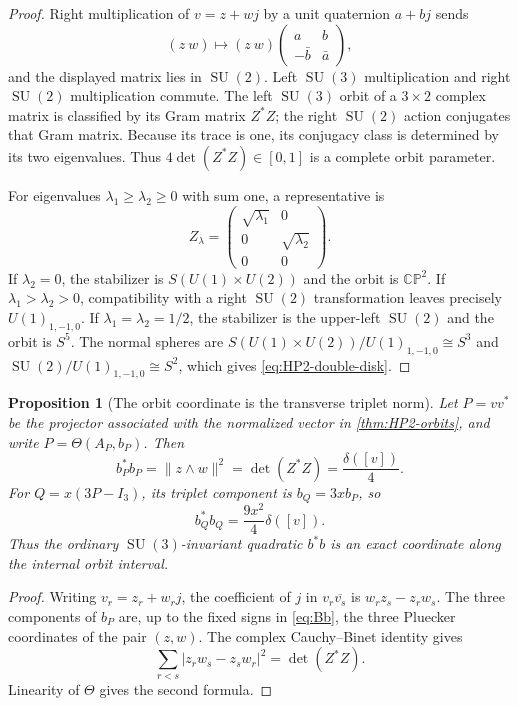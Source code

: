 \documentclass[11pt]{article}
\newtheorem{proposition}[theorem]{Proposition}
\theoremstyle{definition}
\theoremstyle{remark}
\newcommand{\CP}{\mathbb{CP}}
\newcommand{\SU}{\operatorname{SU}}
\begin{document}
\begin{proof}
Right multiplication of $v=z+w j$ by a unit quaternion $a+bj$ sends
\[
 (z\ w)\longmapsto
 (z\ w)
 \begin{pmatrix}a&b\\-\bar b&\bar a\end{pmatrix},
\]
and the displayed matrix lies in $\SU(2)$.  Left $\SU(3)$ multiplication and
right $\SU(2)$ multiplication commute.  The left $\SU(3)$ orbit of a
$3\times2$ complex matrix is classified by its Gram matrix $Z^*Z$; the right
$\SU(2)$ action conjugates that Gram matrix.  Because its trace is one, its
conjugacy class is determined by its two eigenvalues.  Thus
$4\det(Z^*Z)\in[0,1]$ is a complete orbit parameter.

For eigenvalues $\lambda_1\geq\lambda_2\geq0$ with sum one, a representative
is
\[
 Z_{\lambda}
 =\begin{pmatrix}\sqrt{\lambda_1}&0\\
                  0&\sqrt{\lambda_2}\\0&0\end{pmatrix}.
\]
If $\lambda_2=0$, the stabilizer is $S(U(1)\times U(2))$ and the orbit is
$\CP^2$.  If $\lambda_1>\lambda_2>0$, compatibility with a right $\SU(2)$
transformation leaves precisely $U(1)_{1,-1,0}$.  If
$\lambda_1=\lambda_2=1/2$, the stabilizer is the upper-left $\SU(2)$ and the
orbit is $S^5$.  The normal spheres are
$S(U(1)\times U(2))/U(1)_{1,-1,0}\cong S^3$ and
$\SU(2)/U(1)_{1,-1,0}\cong S^2$, which gives
\eqref{eq:HP2-double-disk}.
\end{proof}

\begin{proposition}[The orbit coordinate is the transverse triplet norm]\label{prop:delta-b}
Let $P=vv^*$ be the projector associated with the normalized vector in
\cref{thm:HP2-orbits}, and write $P=\Theta(A_P,b_P)$.  Then
\begin{equation}\label{eq:b-pluecker}
 \boxed{
 b_P^*b_P
 =\|z\wedge w\|^2
 =\det(Z^*Z)
 =\frac{\delta([v])}{4}.}
\end{equation}
For $Q=x(3P-I_3)$, its triplet component is $b_Q=3x b_P$, so
\begin{equation}\label{eq:b-vacuum-coordinate}
 \boxed{b_Q^*b_Q=\frac{9x^2}{4}\delta([v]).}
\end{equation}
Thus the ordinary $\SU(3)$-invariant quadratic $b^*b$ is an exact coordinate
along the internal orbit interval.
\end{proposition}

\begin{proof}
Writing $v_r=z_r+w_rj$, the coefficient of $j$ in
$v_r\overline{v_s}$ is $w_rz_s-z_rw_s$.  The three components of $b_P$ are,
up to the fixed signs in \eqref{eq:Bb}, the three Pluecker coordinates of the
pair $(z,w)$.  The complex Cauchy--Binet identity gives
\[
 \sum_{r<s}|z_rw_s-z_sw_r|^2=\det(Z^*Z).
\]
Linearity of $\Theta$ gives the second formula.
\end{proof}
\end{document}
